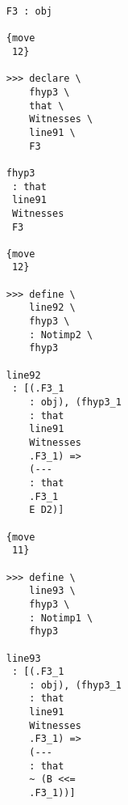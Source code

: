\documentclass[12pt]{article}
\begin{document}
\begin{verbatim}
                                    F3 : obj

                                    {move 
                                     12}

                                    >>> declare \
                                        fhyp3 \
                                        that \
                                        Witnesses \
                                        line91 \
                                        F3

                                    fhyp3 
                                     : that 
                                     line91 
                                     Witnesses 
                                     F3

                                    {move 
                                     12}

                                    >>> define \
                                        line92 \
                                        fhyp3 \
                                        : Notimp2 \
                                        fhyp3

                                    line92 
                                     : [(.F3_1 
                                        : obj), (fhyp3_1 
                                        : that 
                                        line91 
                                        Witnesses 
                                        .F3_1) => 
                                        (--- 
                                        : that 
                                        .F3_1 
                                        E D2)]

                                    {move 
                                     11}

                                    >>> define \
                                        line93 \
                                        fhyp3 \
                                        : Notimp1 \
                                        fhyp3

                                    line93 
                                     : [(.F3_1 
                                        : obj), (fhyp3_1 
                                        : that 
                                        line91 
                                        Witnesses 
                                        .F3_1) => 
                                        (--- 
                                        : that 
                                        ~ (B <<= 
                                        .F3_1))]


\end{verbatim}
\end{document}
